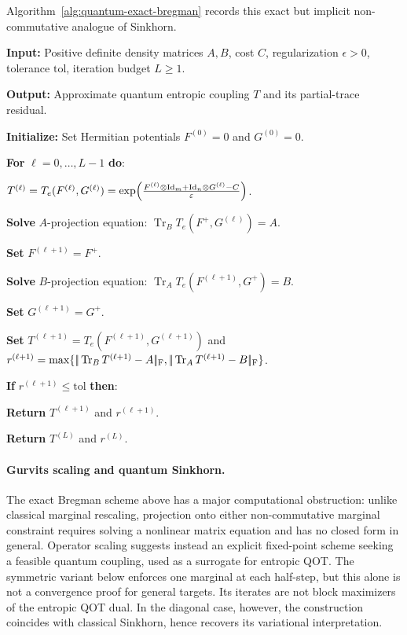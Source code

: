 Algorithm~\ref{alg:quantum-exact-bregman} records this exact but implicit non-commutative analogue of Sinkhorn.

\begin{alg}\label{alg:quantum-exact-bregman}
\textbf{Input:} Positive definite density matrices $A,B$, cost $C$, regularization $\epsilon>0$, tolerance $\mathrm{tol}$, iteration budget $L\geq1$.

\textbf{Output:} Approximate quantum entropic coupling $T$ and its partial-trace residual.

\textbf{Initialize:} Set Hermitian potentials $F^{(0)}=0$ and $G^{(0)}=0$.

\textbf{For} $\ell=0,\ldots,L-1$ \textbf{do}:
\begin{algblock}
\(T^{(\ell)}= T_e(F^{(\ell)},G^{(\ell)}) = \exp\!\left( \frac{F^{(\ell)}\otimes\mathrm{Id}_m+\mathrm{Id}_n\otimes G^{(\ell)}-C}{\varepsilon} \right)\).

\textbf{Solve} $A$-projection equation:
\(\operatorname{Tr}_B T_e(F^+,G^{(\ell)})=A\).

\textbf{Set} $F^{(\ell+1)}=F^+$.

\textbf{Solve} $B$-projection equation:
\(\operatorname{Tr}_A T_e(F^{(\ell+1)},G^+)=B\).

\textbf{Set} $G^{(\ell+1)}=G^+$.

\textbf{Set} $T^{(\ell+1)}=T_e(F^{(\ell+1)},G^{(\ell+1)})$ and
\(r^{(\ell+1)}=\max\{|\!| \operatorname{Tr}_B T^{(\ell+1)}-A |\!|_{\mathrm F},|\!| \operatorname{Tr}_A T^{(\ell+1)}-B |\!|_{\mathrm F}\}\).

\textbf{If} $r^{(\ell+1)}\leq\mathrm{tol}$ \textbf{then}:
\begin{algblock}
\textbf{Return} $T^{(\ell+1)}$ and $r^{(\ell+1)}$.
\end{algblock}
\end{algblock}
\algreturnskip
\textbf{Return} $T^{(L)}$ and $r^{(L)}$.
\end{alg}

\paragraph{Gurvits scaling and quantum Sinkhorn.}
The exact Bregman scheme above has a major computational obstruction: unlike classical marginal rescaling, projection onto either non-commutative marginal constraint requires solving a nonlinear matrix equation and has no closed form in general. Operator scaling suggests instead an explicit fixed-point scheme seeking a feasible quantum coupling, used as a surrogate for entropic QOT\@. The symmetric variant below enforces one marginal at each half-step, but this alone is not a convergence proof for general targets. Its iterates are not block maximizers of the entropic QOT dual. In the diagonal case, however, the construction coincides with classical Sinkhorn, hence recovers its variational interpretation.

